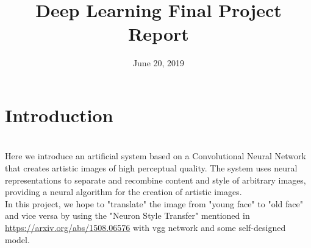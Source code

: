 \documentclass[11pt, a4paper]{article} %
\title{Deep Learning Final Project Report} %
\begin{document}


\date{June 20, 2019}

\maketitle{} %

\setcounter{page}{1} %

\section{Introduction} %
\\ Here we introduce an
artificial system based on a Convolutional Neural Network that creates artistic images
of high perceptual quality. The system uses neural representations to separate and recombine content and style of arbitrary images, providing a neural
algorithm for the creation of artistic images. 
\\ In this project, we hope to "translate" the image from "young face" to "old face" and vice versa by using the "Neuron Style Transfer" mentioned in \url{https://arxiv.org/abs/1508.06576} with vgg network and some self-designed model.
\end{document}
